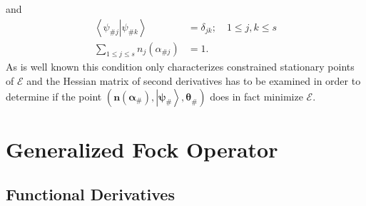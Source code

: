 \documentclass[aps,preprint]{revtex4}%
\begin{document}
and
\begin{align}
\left\langle \left.  \psi_{\#j}\right\vert \psi_{\#k}\right\rangle  &
=\delta_{jk};\quad1\leq j,k\leq s\nonumber\\
\sum_{1\leq j\leq s}n_{j}\left(  \alpha_{\#j}\right)   &  =1.
\end{align}
As is well known this condition only characterizes constrained stationary
points of $\mathcal{E}$ and the Hessian matrix of second derivatives has to be
examined in order to determine if the point $\left(  \mathbf{n}\left(
\mathbf{\alpha}_{\#}\right)  \mathbf{,}\left\vert \mathbf{\psi}_{\#}%
\right\rangle \mathbf{,\theta}_{\#}\right)  $ does in fact minimize
$\mathcal{E}.$

\section{Generalized Fock Operator \label{Fock}}

\subsection{Functional Derivatives}
\end{document}
